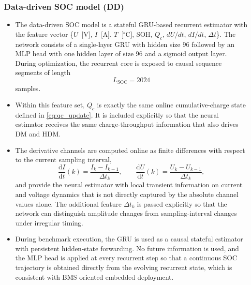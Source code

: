 \documentclass[review]{elsarticle}
\begin{document}
\subsubsection{Data-driven SOC model (DD)}
\begin{itemize}[leftmargin=*]
    \item The data-driven SOC model is a stateful GRU-based recurrent estimator with the feature vector \{$U$~[V], $I$~[A], $T$~[$^\circ$C], SOH, $Q_c$, $dU/dt$, $dI/dt$, $\Delta t$\}. The network consists of a single-layer GRU with hidden size $96$ followed by an MLP head with one hidden layer of size $96$ and a sigmoid output layer. During optimization, the recurrent core is exposed to causal sequence segments of length
    \begin{equation}
        L_{\mathrm{SOC}} = 2024
    \end{equation}
    samples.
    \item Within this feature set, $Q_c$ is exactly the same online cumulative-charge state defined in \eqref{eq:qc_update}. It is included explicitly so that the neural estimator receives the same charge-throughput information that also drives DM and HDM.
    \item The derivative channels are computed online as finite differences with respect to the current sampling interval,
    \begin{equation}
        \frac{\mathrm{d}I}{\mathrm{d}t}(k)=\frac{I_k-I_{k-1}}{\Delta t_k},
        \qquad
        \frac{\mathrm{d}U}{\mathrm{d}t}(k)=\frac{U_k-U_{k-1}}{\Delta t_k},
        \label{eq:derivative_features}
    \end{equation}
    and provide the neural estimator with local transient information on current and voltage dynamics that is not directly captured by the absolute channel values alone. The additional feature $\Delta t_k$ is passed explicitly so that the network can distinguish amplitude changes from sampling-interval changes under irregular timing.
    \item During benchmark execution, the GRU is used as a causal stateful estimator with persistent hidden-state forwarding. No future information is used, and the MLP head is applied at every recurrent step so that a continuous SOC trajectory is obtained directly from the evolving recurrent state, which is consistent with BMS-oriented embedded deployment.
\end{itemize}
\end{document}

